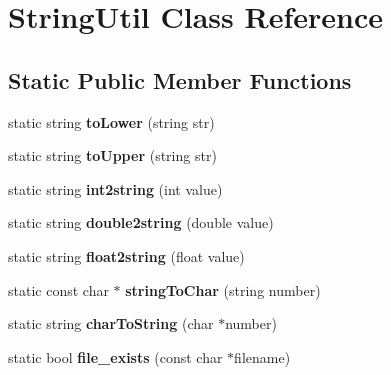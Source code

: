 \hypertarget{classStringUtil}{}\section{String\+Util Class Reference}
\label{classStringUtil}
\subsection*{Static Public Member Functions}
\begin{DoxyCompactItemize}
\item 
static string {\bfseries to\+Lower} (string str)\hypertarget{classStringUtil_a2e9e16d6c5eb4d20aff43af663acb927}{}\label{classStringUtil_a2e9e16d6c5eb4d20aff43af663acb927}

\item 
static string {\bfseries to\+Upper} (string str)\hypertarget{classStringUtil_a365c86f5cfacefdf4ecaa58d8acaf773}{}\label{classStringUtil_a365c86f5cfacefdf4ecaa58d8acaf773}

\item 
static string {\bfseries int2string} (int value)\hypertarget{classStringUtil_a7c68626679b780de4bea53492e5ff469}{}\label{classStringUtil_a7c68626679b780de4bea53492e5ff469}

\item 
static string {\bfseries double2string} (double value)\hypertarget{classStringUtil_a41413490b7d53ddcf972445ad6195563}{}\label{classStringUtil_a41413490b7d53ddcf972445ad6195563}

\item 
static string {\bfseries float2string} (float value)\hypertarget{classStringUtil_aef03494ef352e5339ae3dd8dd0a06a98}{}\label{classStringUtil_aef03494ef352e5339ae3dd8dd0a06a98}

\item 
static const char $\ast$ {\bfseries string\+To\+Char} (string number)\hypertarget{classStringUtil_a49837a7245d44347d6e8ca8efcff68db}{}\label{classStringUtil_a49837a7245d44347d6e8ca8efcff68db}

\item 
static string {\bfseries char\+To\+String} (char $\ast$number)\hypertarget{classStringUtil_a8c9211074092a31195cf2d4b3ffe7305}{}\label{classStringUtil_a8c9211074092a31195cf2d4b3ffe7305}

\item 
static bool {\bfseries file\+\_\+exists} (const char $\ast$filename)\hypertarget{classStringUtil_a789d5ad5627afd6e948dbf651fb2444d}{}\label{classStringUtil_a789d5ad5627afd6e948dbf651fb2444d}


\end{DoxyCompactItemize}
